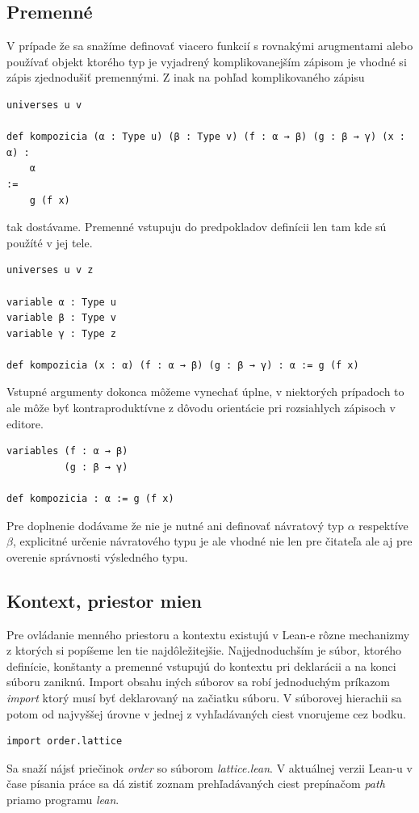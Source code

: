 \documentclass[a4paper,10pt,oneside]{report}%
\begin{document}
\subsection{Premenné}
    V prípade že sa snažíme definovať viacero funkcií s rovnakými arugmentami alebo
používať objekt ktorého typ je vyjadrený komplikovanejším zápisom je vhodné si
zápis zjednodušiť premennými.
    Z inak na pohľad komplikovaného zápisu
\begin{lstlisting}
universes u v

def kompozicia (α : Type u) (β : Type v) (f : α → β) (g : β → γ) (x : α) :
    α
:=
    g (f x)
\end{lstlisting}
    tak dostávame.
    Premenné vstupuju do predpokladov definícii len tam kde sú použíté v jej tele.
\begin{lstlisting}
universes u v z

variable α : Type u
variable β : Type v
variable γ : Type z

def kompozicia (x : α) (f : α → β) (g : β → γ) : α := g (f x)
\end{lstlisting}
    Vstupné argumenty dokonca môžeme vynechať úplne, v niektorých prípadoch to ale
môže byť kontraproduktívne z dôvodu orientácie pri rozsiahlych zápisoch v editore.
\begin{lstlisting}
variables (f : α → β)
          (g : β → γ)

def kompozicia : α := g (f x)
\end{lstlisting}
Pre doplnenie dodávame že nie je nutné ani definovať návratový typ $\alpha$
    respektíve $\beta$, explicitné určenie návratového typu je ale vhodné nie len
    pre čitateľa ale aj pre overenie správnosti výsledného typu.
\subsection{Kontext, priestor mien}
    Pre ovládanie menného priestoru a kontextu existujú v Lean-e rôzne mechanizmy
z ktorých si popíšeme len tie najdôležitejšie.
    Najjednoduchším je súbor, ktorého definície, konštanty a premenné vstupujú do
kontextu pri deklarácii a na konci súboru zaniknú.
    Import obsahu iných súborov sa robí jednoduchým príkazom \emph{import} ktorý
musí byť deklarovaný na začiatku súboru. V súborovej hierachii sa potom od najvyššej
úrovne v jednej z vyhľadávaných ciest vnorujeme cez bodku.
\begin{lstlisting}
import order.lattice
\end{lstlisting}
    Sa snaží nájsť priečinok \emph{order} so súborom \emph{lattice.lean}.
    V aktuálnej verzii Lean-u v čase písania práce sa dá zistiť zoznam prehľadávaných
ciest prepínačom \emph{path} priamo programu \emph{lean}.
\end{document}
